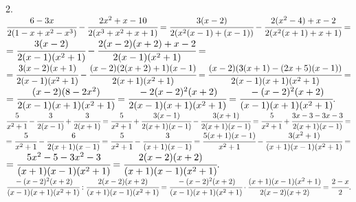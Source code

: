 2. $\cfrac{6-3x}{2(1-x+x^2-x^3)}-\cfrac{2x^2+x-10}{2(x^3+x^2+x+1)}=
\cfrac{3(x-2)}{2(x^2(x-1)+(x-1))}-\cfrac{2(x^2-4)+x-2}{2(x^2(x+1)+x+1)}=$\\
$=\cfrac{3(x-2)}{2(x-1)(x^2+1)}-\cfrac{2(x-2)(x+2)+x-2}{2(x-1)(x^2+1)}=$\\
$=\cfrac{3(x-2)(x+1)}{2(x-1)(x^2+1)}-\cfrac{(x-2)(2(x+2)+1)(x-1)}{2(x+1)(x^2+1)}=\cfrac{(x-2)(3(x+1)-(2x+5)(x-1))}{2(x-1)(x+1)(x^2+1)}=$\\
$=\cfrac{(x-2)(8-2x^2)}{2(x-1)(x+1)(x^2+1)}=\cfrac{-2(x-2)^2(x+2)}{2(x-1)(x+1)(x^2+1)}=\cfrac{-(x-2)^2(x+2)}{(x-1)(x+1)(x^2+1)}.$\\
$\cfrac{5}{x^2+1}-\cfrac{3}{2(x-1)}+\cfrac{3}{2(x+1)}=\cfrac{5}{x^2+1}+\cfrac{3(x-1)}{2(x+1)(x-1)}-\cfrac{3(x+1)}{2(x+1)(x-1)}=
\cfrac{5}{x^2+1}+\cfrac{3x-3-3x-3}{2(x+1)(x-1)}=$\\$=\cfrac{5}{x^2+1}-\cfrac{6}{2(x+1)(x-1)}=\cfrac{5}{x^2+1}-\cfrac{3}{(x+1)(x-1)}=
\cfrac{5(x+1)(x-1)}{x^2+1}-\cfrac{3(x^2+1)}{(x+1)(x-1)(x^2+1)}=$\\$=\cfrac{5x^2-5-3x^2-3}{(x+1)(x-1)(x^2+1)}=
\cfrac{2(x-2)(x+2)}{(x+1)(x-1)(x^2+1)}.
$\\
$\cfrac{-(x-2)^2(x+2)}{(x-1)(x+1)(x^2+1)}:\cfrac{2(x-2)(x+2)}{(x+1)(x-1)(x^2+1)}=\cfrac{-(x-2)^2(x+2)}{(x-1)(x+1)(x^2+1)}\cdot\cfrac{(x+1)(x-1)(x^2+1)}{2(x-2)(x+2)}=\cfrac{2-x}{2}.$\\
